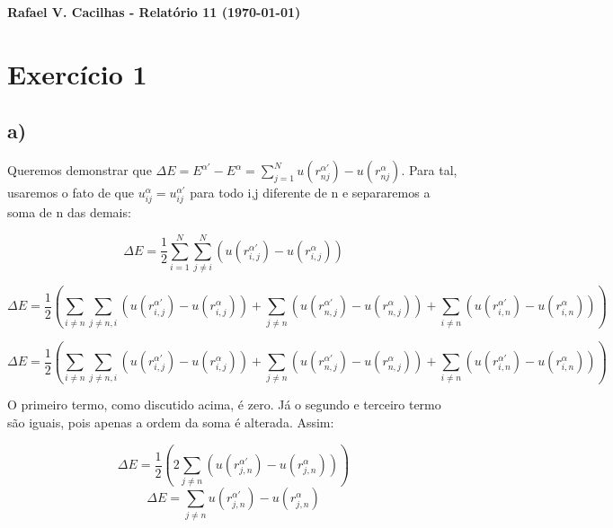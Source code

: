 \documentclass[a4wide]{report}
\begin{document}
\noindent
{\bf Rafael V. Cacilhas  - Relatório 11 (\today)}

\vspace{0.5cm}

\section*{Exercício 1}

\subsection*{a) }
Queremos demonstrar que $\Delta E = E^{\alpha'} - E^{\alpha} = \sum\limits_{j = 1}^{N} u(r^{\alpha'}_{nj}) - u(r^{\alpha}_{nj})$. Para tal, usaremos o fato de que $u^{\alpha}_{ij} =u^{\alpha'}_{ij} $ para todo i,j diferente de n e separaremos a soma de n das demais:

\begin{equation*}
\Delta E  =\frac{1}{2} \sum\limits_{i = 1}^{N}\sum\limits_{j \ne i}^{N} \left( u(r^{\alpha'}_{i,j}) - u(r^{\alpha}_{i,j} ) \right)
\end{equation*} 

\begin{equation*}
\Delta E  =\frac{1}{2} \left( \sum\limits_{i \neq n}\sum\limits_{j \neq n,i}\left( u(r^{\alpha'}_{i,j}) - u(r^{\alpha}_{i,j} ) \right) + \sum\limits_{j \neq n} \left( u(r^{\alpha'}_{n,j}) - u(r^{\alpha}_{n,j} ) \right) + \sum\limits_{i \neq n}\left( u(r^{\alpha'}_{i,n}) - u(r^{\alpha}_{i,n} ) \right)\right)
\end{equation*} 

\begin{equation*}
\Delta E  =\frac{1}{2} \left( \sum\limits_{i \neq n}\sum\limits_{j \neq n,i}\left( u(r^{\alpha'}_{i,j}) - u(r^{\alpha}_{i,j} ) \right) + \sum\limits_{j \neq n} \left( u(r^{\alpha'}_{n,j}) - u(r^{\alpha}_{n,j} ) \right) + \sum\limits_{i \neq n}\left( u(r^{\alpha'}_{i,n}) - u(r^{\alpha}_{i,n} ) \right)\right)
\end{equation*} 

O primeiro termo, como discutido acima, é zero. Já o segundo e terceiro termo são iguais, pois apenas a ordem da soma é alterada. Assim:

\begin{equation*}
\Delta E  =\frac{1}{2} \left( 2\sum\limits_{j \neq n}\left( u(r^{\alpha'}_{j,n}) - u(r^{\alpha}_{j,n} ) \right)\right)
\end{equation*} 
\begin{equation}
\Delta E  =\sum\limits_{j \neq n} u(r^{\alpha'}_{j,n}) - u(r^{\alpha}_{j,n} )
\end{equation} 
\end{document}
